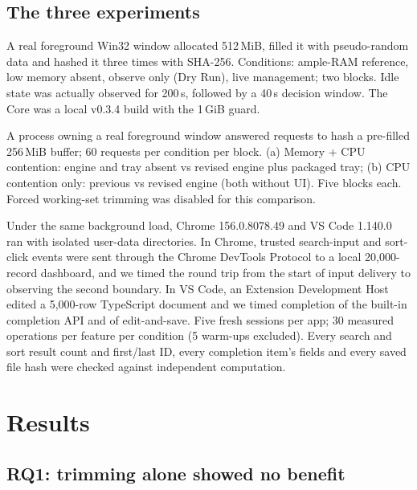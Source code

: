 \documentclass[11pt]{article}
\begin{document}
\subsection{The three experiments}
\begin{description}[leftmargin=1.2em,style=nextline,itemsep=3pt]
  \item[E1. Low-memory completion time (before the background-control revision)] A real foreground Win32 window allocated 512\,MiB, filled it with pseudo-random data and hashed it three times with SHA-256. Conditions: ample-RAM reference, low memory absent, observe only (Dry Run), live management; two blocks. Idle state was actually observed for 200\,s, followed by a 40\,s decision window. The Core was a local v0.3.4 build with the 1\,GiB guard.
  \item[E2. Explicit background control] A process owning a real foreground window answered requests to hash a pre-filled 256\,MiB buffer; 60 requests per condition per block. (a) Memory + CPU contention: engine and tray absent vs revised engine plus packaged tray; (b) CPU contention only: previous vs revised engine (both without UI). Five blocks each. Forced working-set trimming was disabled for this comparison.
  \item[E3. Real applications] Under the same background load, Chrome 156.0.8078.49 and VS Code 1.140.0 ran with isolated user-data directories. In Chrome, trusted search-input and sort-click events were sent through the Chrome DevTools Protocol to a local 20{,}000-record dashboard, and we timed the round trip from the start of input delivery to observing the second  boundary\citep{cdp}. In VS Code, an Extension Development Host edited a 5{,}000-row TypeScript document and we timed completion of the built-in completion API and of edit-and-save\citep{vscodetest}. Five fresh sessions per app; 30 measured operations per feature per condition (5 warm-ups excluded). Every search and sort result count and first/last ID, every completion item's fields and every saved file hash were checked against independent computation.
\end{description}

\section{Results}
\label{sec:results}

\subsection{RQ1: trimming alone showed no benefit}
\label{sec:rq1}
\end{document}
